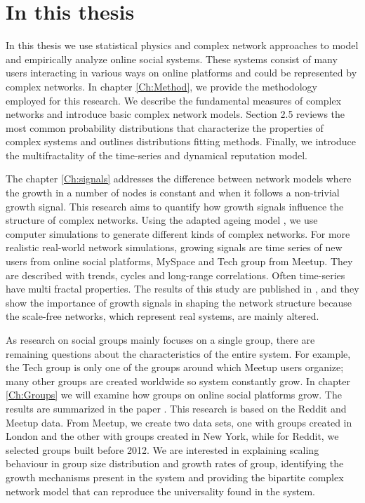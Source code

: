 \section{In this thesis}

In this thesis we use statistical physics and complex network approaches to model and empirically analyze online social systems. These systems consist of many users interacting in various ways on online platforms and could be represented by complex networks. In chapter \ref{Ch:Method}, we provide the methodology employed for this research. We describe the fundamental measures of complex networks and introduce basic complex network models. Section 2.5 reviews the most common probability distributions that characterize the properties of complex systems and outlines distributions fitting methods. Finally, we introduce the multifractality of the time-series and dynamical reputation model. 

The chapter \ref{Ch:signals} addresses the difference between network models where the growth in a number of nodes is constant and when it follows a non-trivial growth signal. This research aims to quantify how growth signals influence the structure of complex networks. Using the adapted ageing model \cite{hajra2004}, we use computer simulations to generate different kinds of complex networks. For more realistic real-world network simulations, growing signals are time series of new users from online social platforms, MySpace and Tech group from Meetup. They are described with trends, cycles and long-range correlations. Often time-series have multi fractal properties. The results of this study are published in \cite{vranic2021growth}, and they show the importance of growth signals in shaping the network structure because the scale-free networks, which represent real systems, are mainly altered. 

As research on social groups mainly focuses on a single group, there are remaining questions about the characteristics of the entire system. 
For example, the Tech group is only one of the groups around which Meetup users organize; many other groups are created worldwide so system constantly grow. 
In chapter \ref{Ch:Groups} we will examine how groups on online social platforms grow. The results are summarized in the paper  \cite{vranic2022universal}. This research is based on the Reddit and Meetup data. From Meetup, we create two data sets, one with groups created in London and the other with groups created in New York, while for Reddit, we selected groups built before 2012. We are interested in explaining scaling behaviour in group size distribution and growth rates of group, identifying the growth mechanisms present in the system and providing the bipartite complex network model that can reproduce the universality found in the system.

